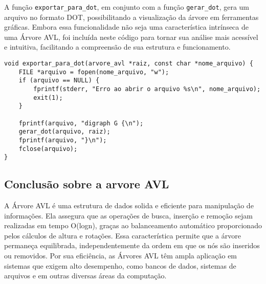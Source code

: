 A função \texttt{exportar\_para\_dot}, em conjunto com a função \texttt{gerar\_dot}, gera um arquivo no formato DOT, possibilitando a visualização da árvore em ferramentas gráficas.
Embora essa funcionalidade não seja uma característica intrínseca de uma Árvore AVL,
foi incluída neste código para tornar sua análise mais acessível e intuitiva, facilitando a compreensão de sua estrutura e funcionamento.

\begin{verbatim}
void exportar_para_dot(arvore_avl *raiz, const char *nome_arquivo) {
    FILE *arquivo = fopen(nome_arquivo, "w");
    if (arquivo == NULL) {
        fprintf(stderr, "Erro ao abrir o arquivo %s\n", nome_arquivo);
        exit(1);
    }

    fprintf(arquivo, "digraph G {\n");
    gerar_dot(arquivo, raiz);
    fprintf(arquivo, "}\n");
    fclose(arquivo);
}
\end{verbatim}


\subsection{Conclusão sobre a arvore AVL}

A Árvore AVL é uma estrutura de dados solida e eficiente para manipulação de informações. 
Ela assegura que as operações de busca, inserção e remoção sejam realizadas em tempo 
O(logn), graças ao balanceamento automático proporcionado pelos cálculos de altura e rotações. 
Essa característica permite que a árvore permaneça equilibrada, independentemente da ordem em que os nós são inseridos ou removidos. 
Por sua eficiência, as Árvores AVL têm ampla aplicação em sistemas que exigem alto desempenho,
como bancos de dados, sistemas de arquivos e em outras diversas áreas da computação.